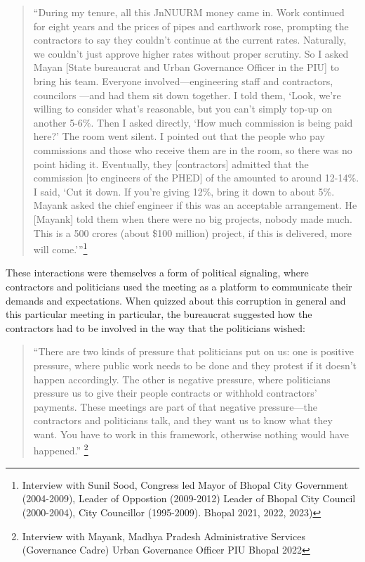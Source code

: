 \begin{quote}
    “During my tenure, all this JnNUURM money came in. Work continued for eight years and the prices of pipes and earthwork rose, prompting the contractors to say they couldn’t continue at the current rates. Naturally, we couldn’t just approve higher rates without proper scrutiny. So I asked Mayan [State bureaucrat and Urban Governance Officer in the PIU] to bring his team. Everyone involved—engineering staff and contractors, councilors —and had them sit down together. I told them, ‘Look, we’re willing to consider what’s reasonable, but you can’t simply top-up on another 5-6\%. Then I asked directly, ‘How much commission is being paid here?’
The room went silent. I pointed out that the people who pay commissions and those who receive them are in the room, so there was no point hiding it. Eventually, they [contractors] admitted that the commission [to engineers of the PHED] of the amounted to around 12-14\%. I said, ‘Cut it down. If you’re giving 12\%, bring it down to about 5\%.  Mayank asked the chief engineer if this was an acceptable arrangement. He [Mayank] told them when there were no big projects, nobody made much. This is a 500 crores (about \$100 million) project, if this is delivered, more will come.’”\footnote{Interview with Sunil Sood, Congress led Mayor of Bhopal City Government (2004-2009), Leader of Oppostion (2009-2012) Leader of Bhopal City Council (2000-2004), City Councillor (1995-2009). Bhopal 2021, 2022, 2023) 
}
\end{quote}

These interactions were themselves a form of political signaling, where contractors and politicians used the meeting as a platform to communicate their demands and expectations. When quizzed about this corruption in general and this particular meeting in particular, the bureaucrat suggested how the contractors had to be involved in the way that the politicians wished: 

\begin{quote}
    “There are two kinds of pressure that politicians put on us: one is positive pressure, where public work needs to be done and they protest if it doesn’t happen accordingly. The other is negative pressure, where politicians pressure us to give their people contracts or withhold contractors’ payments. These meetings are part of that negative pressure—the contractors and politicians talk, and they want us to know what they want. You have to work in this framework, otherwise nothing would have happened.” \footnote{Interview with Mayank, Madhya Pradesh Administrative Services (Governance Cadre) Urban Governance Officer PIU Bhopal 2022
}
\end{quote}

